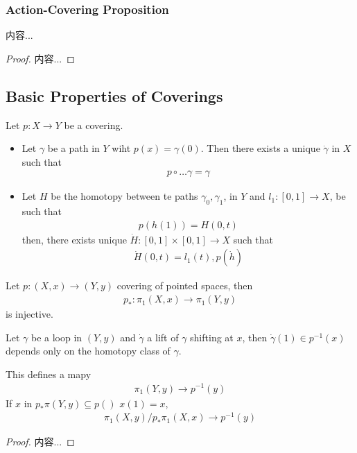 \documentclass[Total.tex]{subfiles}
\begin{document}
	\subsubsection{Action-Covering Proposition}
	\begin{proposition}
		内容...
	\end{proposition}
	\begin{proof}
		内容...
	\end{proof}
	\subsection{Basic Properties of Coverings}
	\begin{proposition}
		Let $p:X\rightarrow Y$ be a covering. 
		\begin{itemize}
			\item Let $\gamma$ be a path in $Y$ wiht $p(x)=\gamma(0)$. Then there exists a unique $\dot{\gamma}$ in $X$ such that
			\begin{gather*}
				p\circ \dots{\gamma}=\gamma
			\end{gather*}
			\item Let $H$ be the homotopy between te paths $\gamma_0,\gamma_1$, in $Y$ and $l_1:[0,1]\rightarrow X$, be such that
			\begin{gather*}
				p(h(1))=H(0,t)
			\end{gather*}
			then, there exists unique $\dot{H}:[0,1]\times [0,1]\rightarrow X$ such that
			\begin{gather*}
				\dot{H}(0,t)=l_1(t),p(\dot{h})
			\end{gather*}
		\end{itemize}
		
		\begin{corollary}
			Let $p:(X,x)\rightarrow (Y,y)$ covering of pointed spaces, then
			\begin{gather*}
				p_*:\pi_1(X,x)\rightarrow \pi_1(Y,y)
			\end{gather*}
			is injective.
		\end{corollary}
		
		\begin{corollary}
			Let $\gamma$ be a loop in $(Y,y)$ and $\dot{\gamma}$ a lift of $\gamma$ shifting at $x$, then $\dot{\gamma}(1)\in p^{-1}(x)$ depends only on the homotopy class of $\gamma$.
			
			This  defines a mapy
			\begin{gather*}
				\pi_1(Y,y)\rightarrow p^{-1}(y)
			\end{gather*}
			If $x$ in $p_*\pi(Y,y)\subseteq p()$ $x(1)=x$,
			\begin{gather*}
				\pi_1(X,y)/p_*\pi_1(X,x)\rightarrow p^{-1}(y)
			\end{gather*}
		\end{corollary}
		\begin{proof}
			内容...
		\end{proof}
		

\end{proposition}
\end{document}
